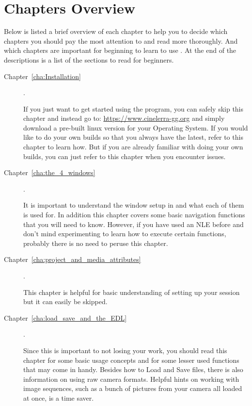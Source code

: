\section*{Chapters Overview}%
\label{sec:chapters_overview}

Below is listed a brief overview of each chapter to help you to decide which chapters you should pay the most attention to and read more thoroughly.
And which chapters are important for beginning to learn to use \CGG{}. At the end of the descriptions is a list of the sections to read for beginners.

\begin{description}
    \item[Chapter~\ref{cha:Installation} ] .

        If you just want to get started using the program, you can safely skip this chapter and instead go to:
        {\small \url{https://www.cinelerra-gg.org}}
        and simply download a pre-built linux version for your Operating System. If you would like to do your own builds so that you always have the latest, refer to this chapter to learn how.
        But if you are already familiar with doing your own builds, you can just refer to this chapter when you encounter issues.
    \item[Chapter~\ref{cha:the_4_windows} ] .

        It is important to understand the window setup in \CGG{} and what each of them is used for.
        In addition this chapter covers some basic navigation functions that you will need to know.
        However, if you have used an NLE before and don’t mind experimenting to learn how to execute certain functions, probably there is no need to peruse this chapter.
    \item[Chapter~\ref{cha:project_and_media_attributes}] .

        This chapter is helpful for basic understanding of setting up your session but it can easily be skipped.

    \item[Chapter~\ref{cha:load_save_and_the_EDL}] .

        Since this is important to not losing your work, you should read this chapter for some basic usage concepts and for some lesser used functions that may come in handy.
        Besides how to Load and Save files, there is also information on using raw camera formats.
        Helpful hints on working with image sequences, such as a bunch of pictures from your camera all loaded at once, is a time saver.


\end{description}
